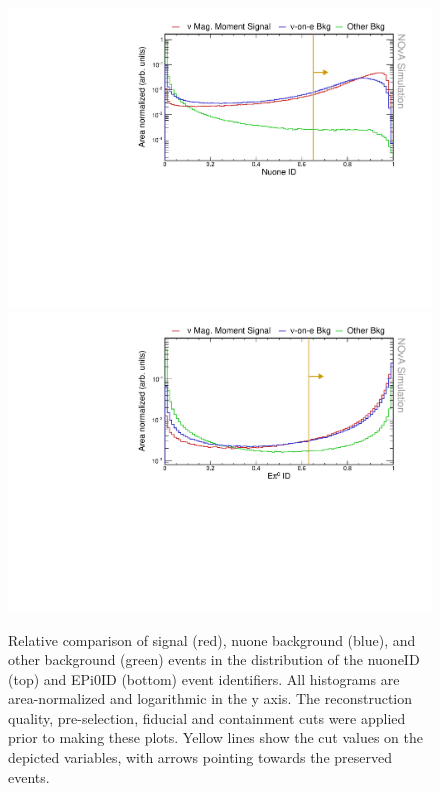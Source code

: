 \begin{figure}[hbtp]
\centering
\includegraphics[width=.9\textwidth]{Plots/NuMMEventSelection/LogY_N1Cut_nuoneidPre.pdf}
\includegraphics[width=.9\textwidth]{Plots/NuMMEventSelection/LogY_N1Cut_epi0idPre.pdf}
\caption[NuoneID and EPi0ID cuts]{Relative comparison of signal (red), \acrshort{nuone} background (blue), and other background (green) events in the distribution of the \acrshort{nuoneID} (top) and \acrshort{EPi0ID} (bottom) event identifiers. All histograms are area-normalized and logarithmic in the y axis. The reconstruction quality, pre-selection, fiducial and containment cuts were applied prior to making these plots. Yellow lines show the cut values on the depicted variables, with arrows pointing towards the preserved events.}
\label{fig:NuMMCutsTMVA3}
\end{figure}

